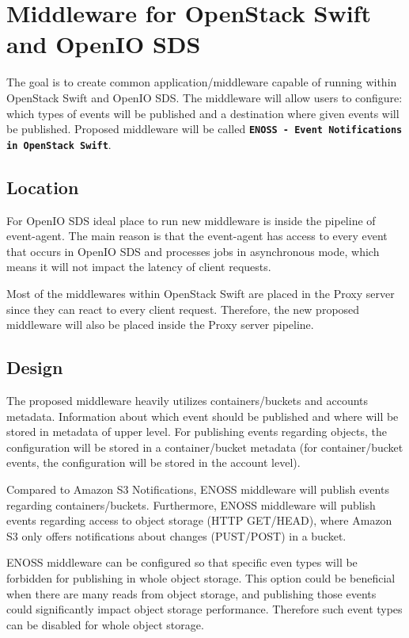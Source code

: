 \section{Middleware for OpenStack Swift and OpenIO SDS}
    The goal is to create common application/middleware capable of running within OpenStack Swift and OpenIO SDS. The middleware will allow users to configure: which types of events will be published and a destination where given events will be published. Proposed middleware will be called \textbf{\texttt{ENOSS - Event Notifications in OpenStack Swift}}.

    \subsection{Location}
    For OpenIO SDS ideal place to run new middleware is inside the pipeline of event-agent. The main reason is that the event-agent has access to every event that occurs in OpenIO SDS and processes jobs in asynchronous mode, which means it will not impact the latency of client requests.

    Most of the middlewares within OpenStack Swift are placed in the Proxy server since they can react to every client request. Therefore, the new proposed middleware will also be placed inside the Proxy server pipeline.

    \subsection{Design}
    The proposed middleware heavily utilizes containers/buckets and accounts metadata. Information about which event should be published and where will be stored in metadata of upper level. For publishing events regarding objects, the configuration will be stored in a container/bucket metadata (for container/bucket events, the configuration will be stored in the account level).

    Compared to Amazon S3 Notifications, ENOSS middleware will publish events regarding containers/buckets. Furthermore, ENOSS middleware will publish events regarding access to object storage (HTTP GET/HEAD), where Amazon S3 only offers notifications about changes (PUST/POST) in a bucket.

    ENOSS middleware can be configured so that specific even types will be forbidden for publishing in whole object storage. This option could be beneficial when there are many reads from object storage, and publishing those events could significantly impact object storage performance. Therefore such event types can be disabled for whole object storage.

